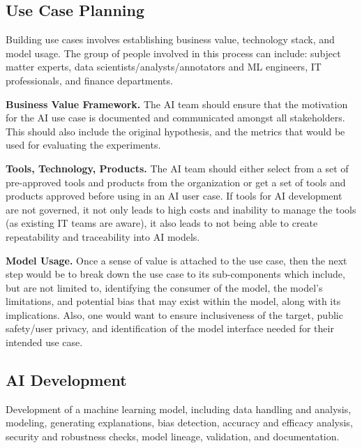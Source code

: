 \documentclass{article}
\begin{document}
\subsection{Use Case Planning}
Building use cases involves establishing business value, technology stack, and model usage. The group of people involved in this process can include: subject matter experts, data scientists/analysts/annotators and ML engineers, IT professionals, and finance departments. 

\textbf{Business Value Framework.} The AI team should ensure that the motivation for the AI use case is documented and communicated amongst all stakeholders. This should also include the original hypothesis, and the metrics that would be used for evaluating the experiments.
    
\textbf{Tools, Technology, Products.} The AI team should either select from a set of pre-approved tools and products from the organization or get a set of tools and products approved before using in an AI user case. If tools for AI development are not governed, it not only leads to high costs and inability to manage the tools (as existing IT teams are aware), it also leads to not being able to create repeatability and traceability into AI models.
    
\textbf{Model Usage.} Once a sense of value is attached to the use case, then the next step would be to break down the use case to its sub-components which include, but are not limited to, identifying the consumer of the model, the model’s limitations, and potential bias that may exist within the model, along with its implications. Also, one would want to ensure inclusiveness of the target, public safety/user privacy, and identification of the model interface needed for their intended use case. 

\subsection{AI Development}

Development of a machine learning model, including data handling and analysis, modeling, generating explanations, bias detection, accuracy and efficacy analysis, security and robustness checks, model lineage, validation, and documentation.
\end{document}
